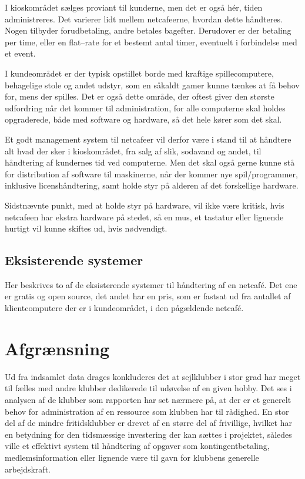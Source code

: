 I kioskområdet sælges proviant til kunderne, men det er også hér, tiden administreres. Det varierer lidt
mellem netcafeerne, hvordan dette håndteres. Nogen tilbyder forudbetaling, andre betales bagefter. Derudover
er der betaling per time, eller en flat--rate for et bestemt antal timer, eventuelt i forbindelse med et
event.

I kundeområdet er der typisk opstillet borde med kraftige spillecomputere, behagelige stole og andet udstyr,
som en såkaldt gamer kunne tænkes at få behov for, mens der spilles. Det er også dette område, der oftest
giver den største udfordring når det kommer til administration, for alle computerne skal holdes opgraderede,
både med software og hardware, så det hele kører som det skal.

Et godt management system til netcafeer vil derfor være i stand til at håndtere alt hvad der sker i
kioskområdet, fra salg af slik, sodavand og andet, til håndtering af kundernes tid ved computerne. Men det
skal også gerne kunne stå for distribution af software til maskinerne, når der kommer nye spil/programmer,
inklusive licenshåndtering, samt holde styr på alderen af det forskellige hardware.

Sidstnævnte punkt, med at holde styr på hardware, vil ikke være kritisk, hvis netcafeen har ekstra hardware på
stedet, så en mus, et tastatur eller lignende hurtigt vil kunne skiftes ud, hvis nødvendigt.


\subsection{Eksisterende systemer}\label{sec:eksisterende-systemer}

Her beskrives to af de eksisterende systemer til håndtering af en netcafé. Det ene er gratis og open source, det andet har en pris, som er fastsat ud fra antallet af klientcomputere der er i kundeområdet, i den pågældende netcafé.

\section{Afgrænsning}

Ud fra indsamlet data drages konkluderes det at sejlklubber i stor grad har meget til fælles med andre klubber dedikerede til udøvelse af en given hobby. Det ses i analysen af de klubber som rapporten har set nærmere på, at der er et generelt behov for administration af en ressource som klubben har til rådighed. En stor del af de mindre fritidsklubber er drevet af en større del af frivillige, hvilket har en betydning for den tidsmæssige investering der kan sættes i projektet, således ville et effektivt system til håndtering af opgaver som kontingentbetaling, medlemsinformation eller lignende være til gavn for klubbens generelle arbejdskraft.

